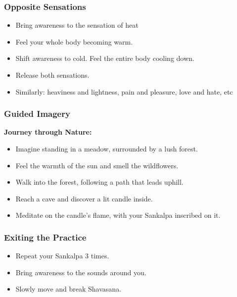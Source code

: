 \begin{frame}[fragile]\frametitle{Opposite Sensations}
    \begin{itemize}
        \item Bring awareness to the sensation of heat
        \item Feel your whole body becoming warm.
        \item Shift awareness to cold. Feel the entire body cooling down.
        \item Release both sensations.
		\item Similarly: heaviness and lightness, pain and pleasure, love and hate, etc
    \end{itemize}
\end{frame}

\begin{frame}[fragile]\frametitle{Guided Imagery}
    \textbf{Journey through Nature:}
    \begin{itemize}
        \item Imagine standing in a meadow, surrounded by a lush forest.
        \item Feel the warmth of the sun and smell the wildflowers.
        \item Walk into the forest, following a path that leads uphill.
        \item Reach a cave and discover a lit candle inside.
        \item Meditate on the candle's flame, with your Sankalpa inscribed on it.
    \end{itemize}
\end{frame}

\begin{frame}[fragile]\frametitle{Exiting the Practice}
    \begin{itemize}
        \item Repeat your Sankalpa 3 times.
        \item Bring awareness to the sounds around you.
        \item Slowly move and break Shavasana.
    \end{itemize}
\end{frame}
